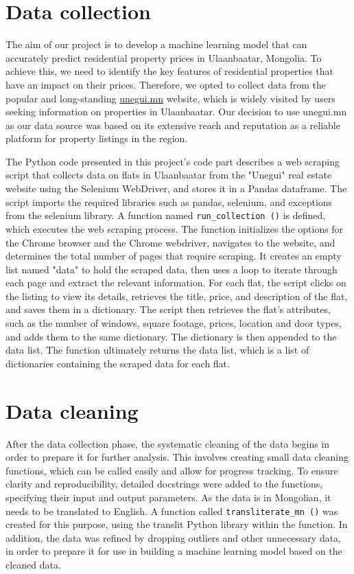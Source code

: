 \documentclass[11pt, a4paper, leqno]{article}
\begin{document}
\section{Data collection} %
\label{sec:data_collection}
The aim of our project is to develop a machine learning model that can accurately predict residential property prices in Ulaanbaatar, Mongolia.
To achieve this, we need to identify the key features of residential properties that have an impact on their prices.
Therefore, we opted to collect data from the popular and long-standing \href{https://www.unegui.mn/}{unegui.mn} website, which is widely visited by users seeking information on properties in Ulaanbaatar.
Our decision to use unegui.mn as our data source was based on its extensive reach and reputation as a reliable platform for property listings in the region.\par
The Python code presented in this project's code part describes a web scraping script that collects data on flats in Ulaanbaatar from the "Unegui" real estate website using the Selenium WebDriver,
and stores it in a Pandas dataframe. The script imports the required libraries such as pandas, selenium, and exceptions from the selenium library.
A function named \texttt{run\_collection ()} is defined, which executes the web scraping process.
The function initializes the options for the Chrome browser and the Chrome webdriver, navigates to the website,
and determines the total number of pages that require scraping.
It creates an empty list named "data" to hold the scraped data, then uses a loop to iterate through each page and extract the relevant information.
For each flat, the script clicks on the listing to view its details, retrieves the title, price, and description of the flat, and saves them in a dictionary.
The script then retrieves the flat's attributes, such as the number of windows, square footage, prices, location and door types, and adds them to the same dictionary.
The dictionary is then appended to the data list. The function ultimately returns the data list, which is a list of dictionaries containing the scraped data for each flat.
\section{Data cleaning} %
\label{sec:data_cleaning}
After the data collection phase, the systematic cleaning of the data begins in order to prepare it for further analysis.
This involves creating small data cleaning functions, which can be called easily and allow for progress tracking.
To ensure clarity and reproducibility, detailed docstrings were added to the functions, specifying their input and output parameters.
As the data is in Mongolian, it needs to be translated to English. A function called \texttt{transliterate\_mn ()} was created for this purpose,
using the translit Python library within the function.
In addition, the data was refined by dropping outliers and other unnecessary data, in order to prepare it for use in building a machine learning model based on the cleaned data.
\end{document}

